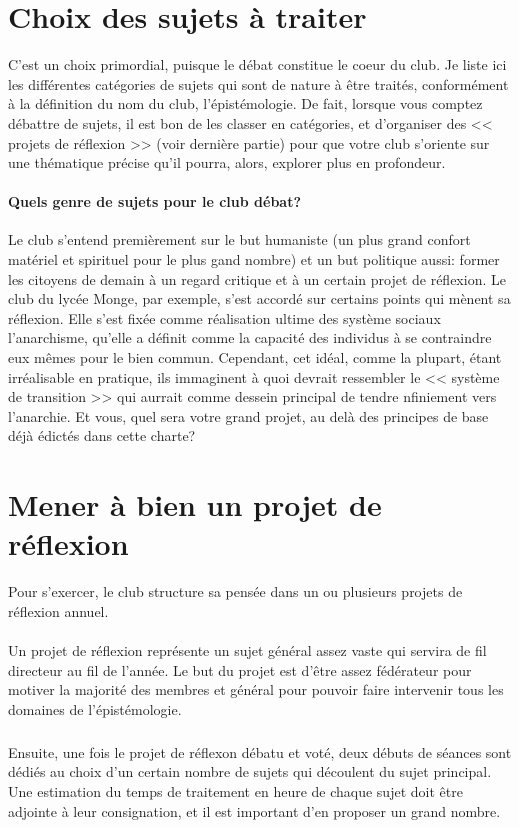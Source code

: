 \documentclass[a4paper,12pt]{article}
\begin{document}
\section{Choix des sujets à traiter}
C'est un choix primordial, puisque le débat constitue le coeur du club. Je liste ici les différentes catégories de sujets qui sont de nature à être traités, conformément à la définition du nom du club, l'épistémologie. De fait, lorsque vous comptez débattre de sujets, il est bon de les classer en catégories, et d'organiser des << projets de réflexion >> (voir dernière partie) pour que votre club s'oriente sur une thématique précise qu'il pourra, alors, explorer plus en profondeur.

\paragraph{Quels genre de sujets pour le club débat?}
Le club s'entend premièrement sur le but humaniste (un plus grand confort matériel et spirituel pour le plus gand nombre) et un but politique aussi: former les citoyens de demain à un regard critique et à un certain projet de réflexion. Le club du lycée Monge, par exemple, s'est accordé sur certains points qui mènent sa réflexion. Elle s'est fixée comme réalisation ultime des système sociaux l'anarchisme, qu'elle a définit comme la capacité des individus à se contraindre eux mêmes pour le bien commun. Cependant, cet idéal, comme la plupart, étant irréalisable en pratique, ils immaginent à quoi devrait ressembler le << système de transition >> qui aurrait comme dessein principal de tendre nfiniement vers l'anarchie. Et vous, quel sera votre grand projet, au delà des principes de base déjà édictés dans cette charte?

\section{Mener à bien un projet de réflexion}
Pour s'exercer, le club structure sa pensée dans un ou plusieurs projets de réflexion annuel.

\paragraph{}
Un projet de réflexion représente un sujet général assez vaste qui servira de fil directeur au fil de l'année. Le but du projet est d'être assez fédérateur pour motiver la majorité des membres et général pour pouvoir faire intervenir tous les domaines de l'épistémologie.
\subparagraph{}
Ensuite, une fois le projet de réflexon débatu et voté, deux débuts de séances sont dédiés au choix d'un certain nombre de sujets qui découlent du sujet principal. Une estimation du temps de traitement en heure de chaque sujet doit être adjointe à leur consignation, et il est important d'en proposer un grand nombre.
\end{document}
